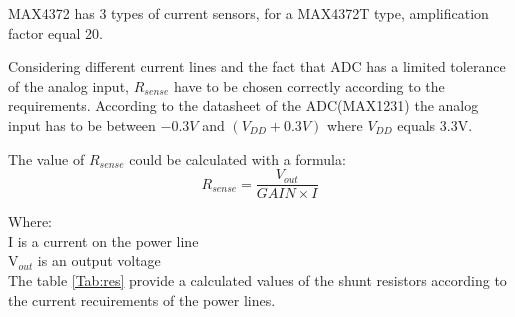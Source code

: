   MAX4372 has 3 types of current sensors, for a MAX4372T type, amplification factor equal 20.
  
  Considering different current lines and the fact that ADC has a limited tolerance of the analog input, $R_{sense}$ have to be chosen correctly according to the requirements. According to the datasheet of the ADC(MAX1231) the analog input has to be between $ -0.3V$ and $(V_{DD} + 0.3V)$ where $V_{DD}$ equals 3.3V.
  
  The value of $R_{sense}$ could be calculated with a formula:
    \begin{equation}
    R_{sense} = \frac{V_{out}}{GAIN \times I}
    \end{equation}
  
  Where:\\
  I is a current on the power line\\
  V$_{out}$ is an output voltage\\ 
 
 The table \ref{Tab:res} provide a calculated values of the shunt resistors according to the current recuirements of the power lines.
  
